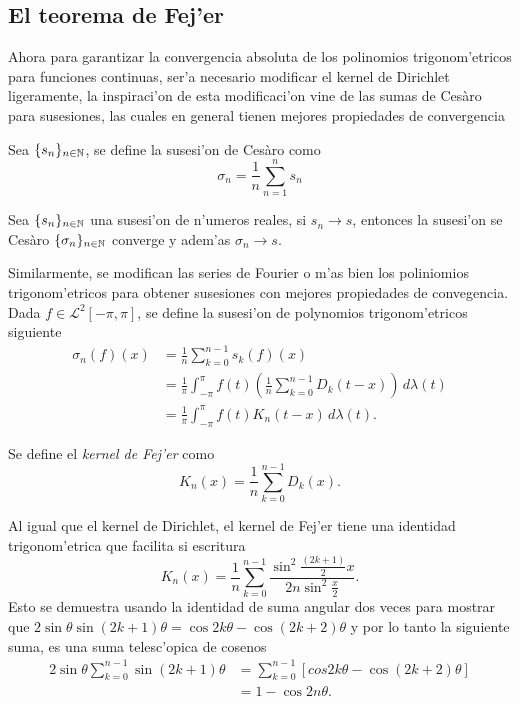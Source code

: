 \documentclass[main.tex]{subfiles}
\begin{document}
    \subsection{El teorema de Fej'er}
    \noindent Ahora para garantizar la convergencia absoluta de los polinomios trigonom'etricos para funciones continuas, ser'a necesario modificar el kernel de Dirichlet ligeramente, la inspiraci'on de esta modificaci'on vine de las sumas de Ces\`aro para susesiones, las cuales en general tienen mejores propiedades de convergencia
    \begin{def.}
      Sea \(\{s_{n}\}_{n\in \mathbb N }\), se define la susesi'on de Ces\`aro como
      \[
        \sigma_{n}=\frac{1}{n}\sum_{n=1}^{n}s_{n}
      \]
      \end{def.}
    \begin{teorema}
      Sea \(\{s_{n}\}_{n\in \mathbb N }\) una susesi'on de n'umeros reales, si \(s_{n}\to s\), entonces la susesi'on se Ces\`aro \(\{\sigma_{n}\}_{n\in \mathbb N }\) converge y adem'as \(\sigma_{n}\to s\).
    \end{teorema}
    Similarmente, se modifican las series de Fourier o m'as bien los poliniomios trigonom'etricos para obtener susesiones con mejores propiedades de convegencia. Dada \(f\in\mathcal{L}^{2}[-\pi,\pi]\), se define la susesi'on de polynomios trigonom'etricos siguiente
    \begin{align*}
      \sigma_{n}(f)(x)&=\frac{1}{n}\sum_{k=0}^{n-1}s_{k}(f)(x)\\
      &=\frac{1}{\pi}\int_{-\pi}^{\pi} f(t)\left(\frac{1}{n}\sum_{k=0}^{n-1}D_{k}(t-x)\right)\,d\lambda(t)\\
      &=\frac{1}{\pi}\int_{-\pi}^{\pi} f(t)K_{n}(t-x)\,d\lambda(t).
    \end{align*}
    \begin{def.}
      Se define el \emph{kernel de Fej'er} como
      \[
        K_{n}(x)=\frac{1}{n}\sum_{k=0}^{n-1}D_{k}(x).
      \]
    \end{def.}
    Al igual que el kernel de Dirichlet, el kernel de Fej'er tiene una identidad trigonom'etrica que facilita si escritura
    \[
      K_{n}(x)=\frac{1}{n}\sum_{k=0}^{n-1}\frac{\sin^{2}\frac{(2k+1)}{2}x}{2n\sin^{2}\frac{x}{2}}.
    \]
    Esto se demuestra usando la identidad de suma angular dos veces para mostrar que \(2\sin\theta\sin(2k+1)\theta=\cos2k\theta-\cos(2k+2)\theta\) y por lo tanto la siguiente suma, es una suma telesc'opica de cosenos
    \begin{align*}
      2\sin\theta\sum_{k=0}^{n-1}\sin(2k+1)\theta&=\sum_{k=0}^{n-1}[cos2k\theta-\cos(2k+2)\theta]\\
                                                 &=1-\cos2n\theta.
      \end{align*}
\end{document}
